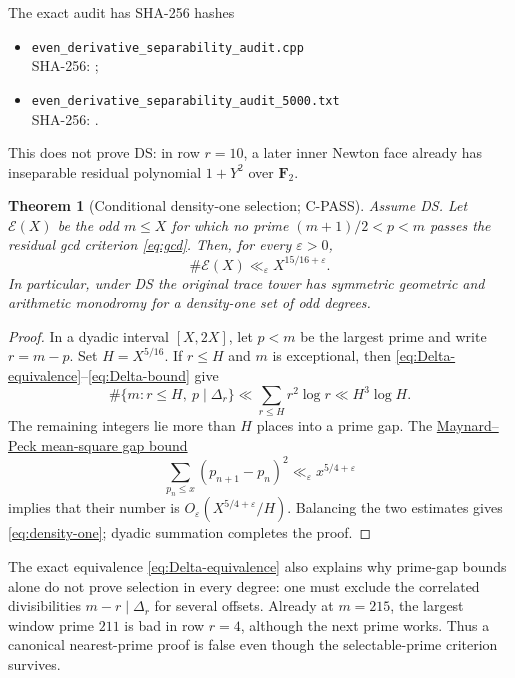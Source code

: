 \documentclass[11pt]{article}
\theoremstyle{keio}
\newtheorem{theorem}{Theorem}[section]
\theoremstyle{keioinput}
\newcommand{\CPASS}{\textcolor{cpassviolet}{\textsf{C-PASS}}}
\newcommand{\F}{\mathbf{F}}
\begin{document}
The exact audit has SHA-256 hashes
\begin{itemize}
\item \nolinkurl{even_derivative_separability_audit.cpp}\\[-.15em]
\textcolor{bluegray}{\small SHA-256: }
\texttt{\small{}};
\item \nolinkurl{even_derivative_separability_audit_5000.txt}\\[-.15em]
\textcolor{bluegray}{\small SHA-256: }
\texttt{\small{}}.
\end{itemize}
This does not prove DS: in row $r=10$, a later inner Newton face already
has inseparable residual polynomial $1+Y^2$ over $\F_2$.

\begin{theorem}[Conditional density-one selection; \CPASS]\label{thm:density-one}
Assume DS. Let $\mathcal E(X)$ be the odd $m\le X$ for which no prime
$(m+1)/2<p<m$ passes the residual gcd criterion \eqref{eq:gcd}. Then, for
every $\varepsilon>0$,
\begin{equation}
\boxed{\#\mathcal E(X)\ll_\varepsilon X^{15/16+\varepsilon}.}
\label{eq:density-one}
\end{equation}
In particular, under DS the original trace tower has symmetric geometric
and arithmetic monodromy for a density-one set of odd degrees.
\end{theorem}

\begin{proof}
In a dyadic interval $[X,2X]$, let $p<m$ be the largest prime and write
$r=m-p$. Set $H=X^{5/16}$. If $r\le H$ and $m$ is exceptional, then
\eqref{eq:Delta-equivalence}--\eqref{eq:Delta-bound} give
\[
\#\{m:r\le H,\ p\mid\Delta_r\}
\ll\sum_{r\le H}r^2\log r
\ll H^3\log H.
\]
The remaining integers lie more than $H$ places into a prime gap. The
\href{https://arxiv.org/abs/1201.1787}{Maynard--Peck mean-square gap bound}
\[
\sum_{p_n\le x}(p_{n+1}-p_n)^2
\ll_\varepsilon x^{5/4+\varepsilon}
\]
implies that their number is
$O_\varepsilon(X^{5/4+\varepsilon}/H)$. Balancing the two estimates gives
\eqref{eq:density-one}; dyadic summation completes the proof.
\end{proof}

The exact equivalence \eqref{eq:Delta-equivalence} also explains why
prime-gap bounds alone do not prove selection in every degree: one must
exclude the correlated divisibilities $m-r\mid\Delta_r$ for several
offsets. Already at $m=215$, the largest window prime $211$ is bad in row
$r=4$, although the next prime works. Thus a canonical nearest-prime proof
is false even though the selectable-prime criterion survives.
\end{document}

